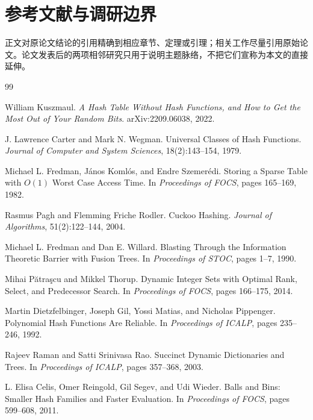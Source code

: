 \documentclass[12pt]{article}
\begin{document}
\section{参考文献与调研边界}

正文对原论文结论的引用精确到相应章节、定理或引理；相关工作尽量引用原始论文。论文发表后的两项相邻研究只用于说明主题脉络，不把它们宣称为本文的直接延伸。

\begin{thebibliography}{99}

William Kuszmaul.
\newblock \textit{A Hash Table Without Hash Functions, and How to Get the Most Out of Your Random Bits}.
\newblock arXiv:2209.06038, 2022.

J. Lawrence Carter and Mark N. Wegman.
\newblock Universal Classes of Hash Functions.
\newblock \textit{Journal of Computer and System Sciences}, 18(2):143--154, 1979.

Michael L. Fredman, János Komlós, and Endre Szemerédi.
\newblock Storing a Sparse Table with $O(1)$ Worst Case Access Time.
\newblock In \textit{Proceedings of FOCS}, pages 165--169, 1982.

Rasmus Pagh and Flemming Friche Rodler.
\newblock Cuckoo Hashing.
\newblock \textit{Journal of Algorithms}, 51(2):122--144, 2004.

Michael L. Fredman and Dan E. Willard.
\newblock Blasting Through the Information Theoretic Barrier with Fusion Trees.
\newblock In \textit{Proceedings of STOC}, pages 1--7, 1990.

Mihai Pătraşcu and Mikkel Thorup.
\newblock Dynamic Integer Sets with Optimal Rank, Select, and Predecessor Search.
\newblock In \textit{Proceedings of FOCS}, pages 166--175, 2014.

Martin Dietzfelbinger, Joseph Gil, Yossi Matias, and Nicholas Pippenger.
\newblock Polynomial Hash Functions Are Reliable.
\newblock In \textit{Proceedings of ICALP}, pages 235--246, 1992.

Rajeev Raman and Satti Srinivasa Rao.
\newblock Succinct Dynamic Dictionaries and Trees.
\newblock In \textit{Proceedings of ICALP}, pages 357--368, 2003.

L. Elisa Celis, Omer Reingold, Gil Segev, and Udi Wieder.
\newblock Balls and Bins: Smaller Hash Families and Faster Evaluation.
\newblock In \textit{Proceedings of FOCS}, pages 599--608, 2011.


\end{thebibliography}
\end{document}
